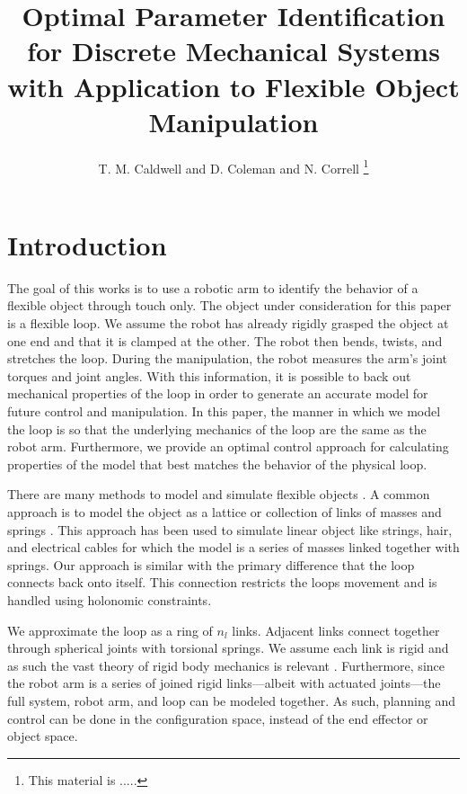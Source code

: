 \documentclass[letterpaper, 10pt, conference]{ieeeconf}
\title{Optimal Parameter Identification for Discrete Mechanical Systems with Application to Flexible Object Manipulation}
\author{T. M. Caldwell and  D. Coleman and N. Correll%
\thanks{
This material is .....}%
}
\begin{document}
\maketitle

\begin{abstract}




\end{abstract}

\section{Introduction}
The goal of this works is to use a robotic arm to identify the behavior of a flexible object through touch only.  The object under consideration for this paper is a flexible loop.  We assume the robot has already rigidly grasped the object at one end and that it is clamped at the other.  The robot then bends, twists, and stretches the loop.  During the manipulation, the robot measures the arm's joint torques and joint angles.  With this information, it is possible to back out mechanical properties of the loop in order to generate an accurate model for future control and manipulation.  In this paper, the manner in which we model the loop is so that the underlying mechanics of the loop are the same as the robot arm.  Furthermore, we provide an optimal control approach for calculating properties of the model that best matches the behavior of the physical loop.

There are many methods to model and simulate flexible objects \cite{khalil_payeur, lang_etal}.  A common approach is to model the object as a lattice or collection of links of masses and springs \cite{sahari_etal, wakamatsu_etal, khalil_payeur}.  This approach has been used to simulate linear object like strings, hair, and electrical cables for which the model is a series of masses linked together with springs.   Our approach is similar with the primary difference that the loop connects back onto itself.  This connection restricts the loops movement and is handled using holonomic constraints.  

We approximate the loop as a ring of $n_l$ links.  Adjacent links connect together through spherical joints with torsional springs. We assume each link is rigid and as such the vast theory of rigid body mechanics is relevant \cite{murray_li_sastry}.  Furthermore, since the robot arm is a series of joined rigid links---albeit with actuated joints---the full system, robot arm, and loop can be modeled together.  As such, planning and control can be done in the configuration space, instead of the end effector or object space. 
\end{document}
